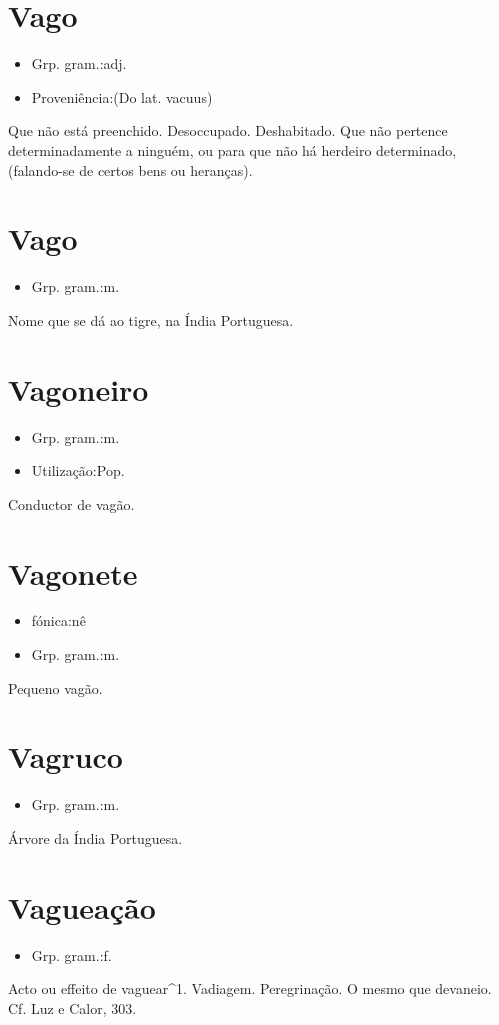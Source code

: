 \documentclass{article}
\begin{document}
\section{Vago}
\begin{itemize}
\item {Grp. gram.:adj.}
\end{itemize}
\begin{itemize}
\item {Proveniência:(Do lat. \textunderscore vacuus\textunderscore )}
\end{itemize}
Que não está preenchido.
Desoccupado.
Deshabitado.
Que não pertence determinadamente a ninguém, ou para que não há herdeiro determinado, (falando-se de certos bens ou heranças).
\section{Vago}
\begin{itemize}
\item {Grp. gram.:m.}
\end{itemize}
Nome que se dá ao tigre, na Índia Portuguesa.
\section{Vagoneiro}
\begin{itemize}
\item {Grp. gram.:m.}
\end{itemize}
\begin{itemize}
\item {Utilização:Pop.}
\end{itemize}
Conductor de vagão.
\section{Vagonete}
\begin{itemize}
\item {fónica:nê}
\end{itemize}
\begin{itemize}
\item {Grp. gram.:m.}
\end{itemize}
Pequeno vagão.
\section{Vagruco}
\begin{itemize}
\item {Grp. gram.:m.}
\end{itemize}
Árvore da Índia Portuguesa.
\section{Vagueação}
\begin{itemize}
\item {Grp. gram.:f.}
\end{itemize}
Acto ou effeito de vaguear^1.
Vadiagem.
Peregrinação.
O mesmo que \textunderscore devaneio\textunderscore . Cf. \textunderscore Luz e Calor\textunderscore , 303.
\end{document}
